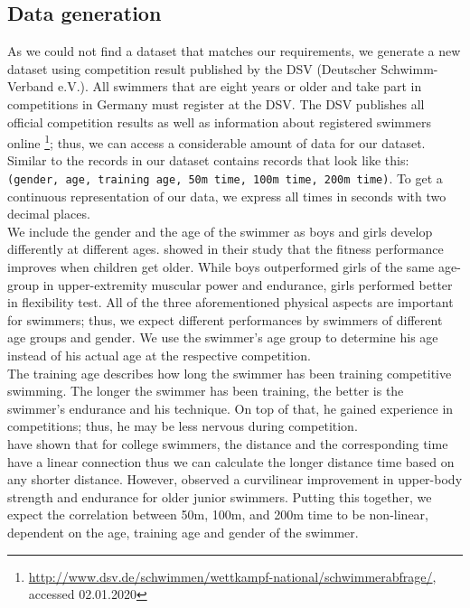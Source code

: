 \subsection{Data generation}\label{sec:data_gen}
As we could not find a dataset that matches our requirements, we generate a new dataset using competition result published by the DSV (Deutscher Schwimm-Verband e.V.). All swimmers that are eight years or older and take part in competitions in Germany must register at the DSV. The DSV publishes all official competition results as well as information about registered swimmers online \footnote{\url{http://www.dsv.de/schwimmen/wettkampf-national/schwimmerabfrage/}, accessed 02.01.2020}; thus, we can access a considerable amount of data for our dataset.\\
Similar to the records in \cite{Xie.2015} our dataset contains records that look like this: \texttt{(gender, age, training age, 50m time, 100m time, 200m time)}. To get a continuous representation of our data, we express all times in seconds with two decimal places.\\
We include the gender and the age of the swimmer as boys and girls develop differently at different ages. \citet{Golle.2015} showed in their study that the fitness performance improves when children get older. While boys outperformed girls of the same age-group in upper-extremity muscular power and endurance, girls performed better in flexibility test. All of the three aforementioned physical aspects are important for swimmers; thus, we expect different performances by swimmers of different age groups and gender. We use the swimmer's age group to determine his age instead of his actual age at the respective competition.\\
The training age describes how long the swimmer has been training competitive swimming. The longer the swimmer has been training, the better is the swimmer's endurance and his technique. On top of that, he gained experience in competitions; thus, he may be less nervous during competition.\\
\citet{Wakayoshi.1992} have shown that for college swimmers, the distance and the corresponding time have a linear connection thus we can calculate the longer distance time based on any shorter distance. However, \citet{Golle.2015} observed a curvilinear improvement in upper-body strength and endurance for older junior swimmers. Putting this together, we expect the correlation between 50m, 100m, and 200m time to be non-linear, dependent on the age, training age and gender of the swimmer.

